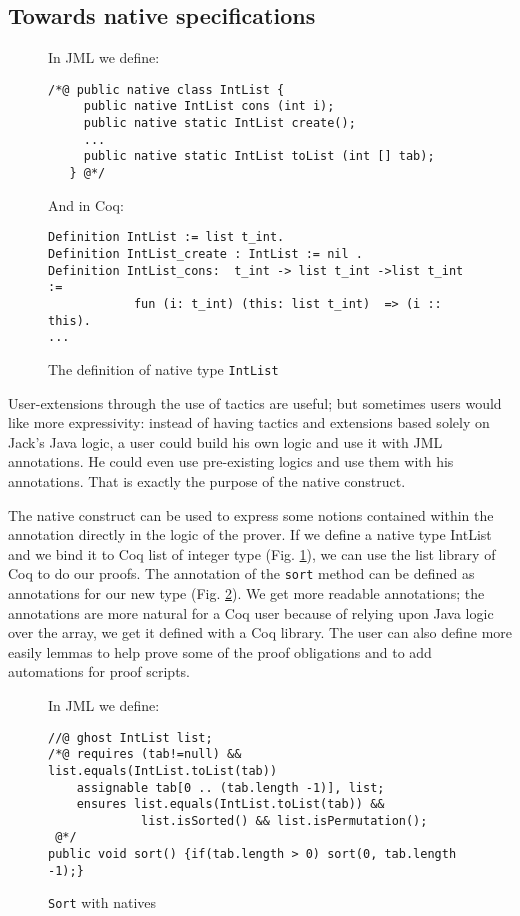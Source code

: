 \subsection{Towards native specifications}
\begin{figure}[t!]
{\small In JML we define:
\begin{verbatim}
/*@ public native class IntList {
     public native IntList cons (int i);
     public native static IntList create();
     ...
     public native static IntList toList (int [] tab);
   } @*/ \end{verbatim}}

{\small And in Coq:
\begin{verbatim}
Definition IntList := list t_int.
Definition IntList_create : IntList := nil .  
Definition IntList_cons:  t_int -> list t_int ->list t_int := 
            fun (i: t_int) (this: list t_int)  => (i :: this).
... \end{verbatim}}
\caption{The definition of native type \texttt{IntList}}\label{CoqAnnot} 
\end{figure}
User-extensions through the use of tactics are useful;
but sometimes users would like more expressivity: instead of having
tactics and extensions based solely on Jack's Java logic, a user could
build his own logic and use it with JML annotations. He could 
even use pre-existing logics and use them with his annotations. That is 
exactly the purpose of the native construct.


The native construct can be used to express some notions contained within
the annotation directly in the logic of the prover. If we define a native type 
IntList and we bind it to Coq list of integer type (Fig. \ref{CoqAnnot}), 
we can use the list library of Coq to do our proofs. The annotation of the
{\tt sort} method can be defined as annotations for our new type 
(Fig. \ref{sortnat}). We get more readable annotations;
the annotations are more natural for a Coq user because of relying upon Java
logic over the array, we get it defined with a Coq library.
The user can also define more easily lemmas to help prove some of the proof
obligations and to add automations for proof scripts.


\begin{figure}[t!]
{\small In JML we define:
\begin{verbatim}
//@ ghost IntList list;
/*@ requires (tab!=null) && list.equals(IntList.toList(tab))
    assignable tab[0 .. (tab.length -1)], list;
    ensures list.equals(IntList.toList(tab)) &&
             list.isSorted() && list.isPermutation();
 @*/
public void sort() {if(tab.length > 0) sort(0, tab.length -1);}\end{verbatim}}
\caption{\texttt{Sort} with natives}\label{sortnat} 
\end{figure}




